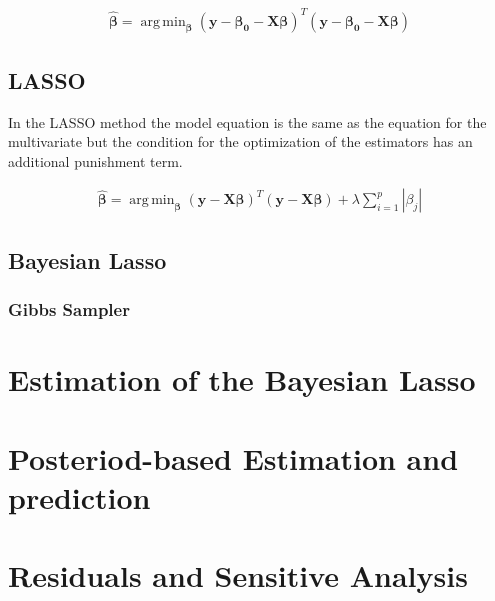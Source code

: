 \documentclass[12pt,a4paper]{article}
\DeclareMathOperator*{\argmin}{arg\,min}
\begin{document}
\begin{align}
\label{eq:lm_con}
 \hat{\pmb{\beta}} = \argmin_{ \pmb{\beta}} (\pmb{y - \beta_0 - X  \beta})^T (\pmb{y - \beta_0 - X  \beta})
\end{align}

\hypertarget{section}{%
\subsection{\texorpdfstring{\acf{LASSO}}{}}\label{section}}

In the \ac{LASSO} method the model equation is the same as the equation
for the multivariate but the condition for the optimization of the
estimators has an additional punishment term.

\begin{align}
\label{eq:la_con}
\hat{\pmb{\beta}} = \argmin_{\pmb{\beta}}  \left( \pmb{y - X \beta} \right)^T \left( \pmb{y - X \beta} \right) + \lambda \sum_{i = 1}^{p} |\beta_j|
\end{align}

\hypertarget{bayesian-lasso}{%
\subsection{Bayesian Lasso}\label{bayesian-lasso}}

\hypertarget{gibbs-sampler}{%
\subsubsection{Gibbs Sampler}\label{gibbs-sampler}}

\hypertarget{estimation-of-the-bayesian-lasso}{%
\section{Estimation of the Bayesian
Lasso}\label{estimation-of-the-bayesian-lasso}}

\hypertarget{posteriod-based-estimation-and-prediction}{%
\section{Posteriod-based Estimation and
prediction}\label{posteriod-based-estimation-and-prediction}}

\hypertarget{residuals-and-sensitive-analysis}{%
\section{Residuals and Sensitive
Analysis}\label{residuals-and-sensitive-analysis}}
\end{document}
